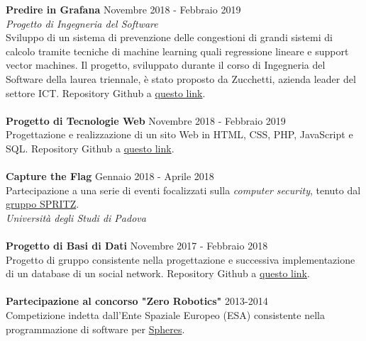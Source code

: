 \documentclass[margin, 10pt]{res}
\begin{document}
\begin{resume}
\textbf{Predire in Grafana} \hfill Novembre 2018 - Febbraio 2019 \\
\textit{Progetto di Ingegneria del Software} \\
Sviluppo di un sistema di prevenzione delle congestioni di grandi sistemi di calcolo tramite tecniche di machine learning quali regressione lineare e support vector machines. Il progetto, sviluppato durante il corso di Ingegneria del Software della laurea triennale, è stato proposto da Zucchetti, azienda leader del settore ICT. Repository Github a \href{https://github.com/CoffeeCodeSWE/swe-predire-in-grafana}{questo link}. \\ \\
\textbf{Progetto di Tecnologie Web} \hfill Novembre 2018 - Febbraio 2019 \\
Progettazione e realizzazione di un sito Web in HTML, CSS, PHP, JavaScript e SQL. Repository Github a \href{https://github.com/enricobu96/TecWebUNIPD}{questo link}. \\ \\
\textbf{Capture the Flag} \hfill Gennaio 2018 - Aprile 2018 \\
Partecipazione a una serie di eventi focalizzati sulla \textit{computer security}, tenuto dal \href{https://spritz.math.unipd.it/}{gruppo SPRITZ}. \\
\textit{Università degli Studi di Padova} \\ \\
\textbf{Progetto di Basi di Dati} \hfill Novembre 2017 - Febbraio 2018 \\
Progetto di gruppo consistente nella progettazione e successiva implementazione di un database di un social network. Repository Github a \href{https://github.com/enricobu96/DB1718}{questo link}. \\ \\
\textbf{Partecipazione al concorso "Zero Robotics"} \hfill 2013-2014 \\
Competizione indetta dall'Ente Spaziale Europeo (ESA) consistente nella programmazione di software per \href{https://www.esa.int/Science_Exploration/Human_and_Robotic_Exploration/Education/Robot_Spheres_in_zero-gravity_action}{Spheres}.



\end{resume}
\end{document}
